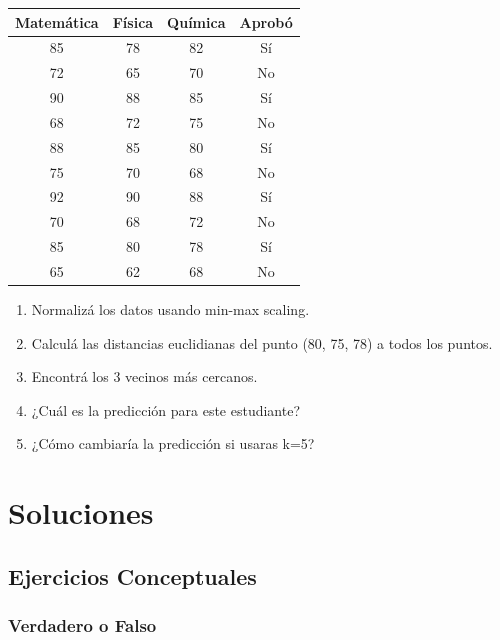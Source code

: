 \documentclass[12pt]{article}
\begin{document}
\begin{table}[H]
    \centering
    \begin{tabular}{cccc}
        \toprule
        \textbf{Matemática} & \textbf{Física} & \textbf{Química} & \textbf{Aprobó} \\
        \midrule
        85 & 78 & 82 & Sí \\
        72 & 65 & 70 & No \\
        90 & 88 & 85 & Sí \\
        68 & 72 & 75 & No \\
        88 & 85 & 80 & Sí \\
        75 & 70 & 68 & No \\
        92 & 90 & 88 & Sí \\
        70 & 68 & 72 & No \\
        85 & 80 & 78 & Sí \\
        65 & 62 & 68 & No \\
        \bottomrule
    \end{tabular}
\end{table}

\begin{enumerate}
    \item Normalizá los datos usando min-max scaling.
    \item Calculá las distancias euclidianas del punto (80, 75, 78) a todos los puntos.
    \item Encontrá los 3 vecinos más cercanos.
    \item ¿Cuál es la predicción para este estudiante?
    \item ¿Cómo cambiaría la predicción si usaras k=5?
\end{enumerate}

\newpage

\section{Soluciones}

\subsection{Ejercicios Conceptuales}

\subsubsection{Verdadero o Falso}
\end{document}
